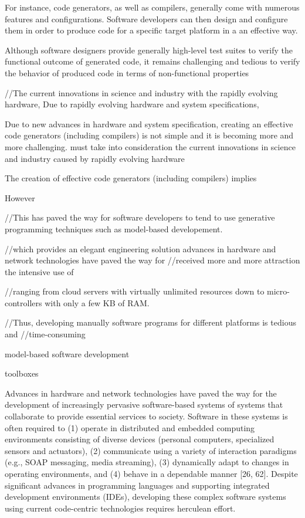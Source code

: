 For instance, code generators, as well as compilers, generally come with numerous features and configurations. Software developers can then design and configure them in order to produce code for a specific target platform in a an effective way. 


 Although software designers provide generally
high-level test suites to verify the functional outcome of generated
code, it remains challenging and tedious to verify the behavior
of produced code in terms of non-functional properties









//The current innovations in science and industry with the rapidly evolving hardware, 
Due to rapidly evolving hardware and system specifications, 

Due to new advances in hardware and system specification, creating an effective code generators (including compilers) is not simple and it is becoming more and more challenging. must take into consideration the current innovations in science and industry caused by rapidly evolving hardware


The creation of effective code generators (including compilers) implies 



However 

//This has paved the way for software developers to tend to use generative programming techniques such as model-based developement. 


//which provides an elegant engineering solution 
advances in hardware and network technologies have paved the way for
//received more and more attraction
the intensive use of

//ranging from cloud servers with virtually unlimited resources down to micro-controllers with only a few KB of RAM.

//Thus, developing manually software programs for different platforms is tedious and //time-consuming 


model-based software development 

toolboxes 

 

Advances in hardware and network technologies have
paved the way for the development of increasingly pervasive
software-based systems of systems that collaborate
to provide essential services to society. Software in these
systems is often required to (1) operate in distributed and
embedded computing environments consisting of diverse
devices (personal computers, specialized sensors and actuators),
(2) communicate using a variety of interaction
paradigms (e.g., SOAP messaging, media streaming), (3)
dynamically adapt to changes in operating environments,
and (4) behave in a dependable manner [26, 62]. Despite
significant advances in programming languages and
supporting integrated development environments (IDEs),
developing these complex software systems using current
code-centric technologies requires herculean effort.


